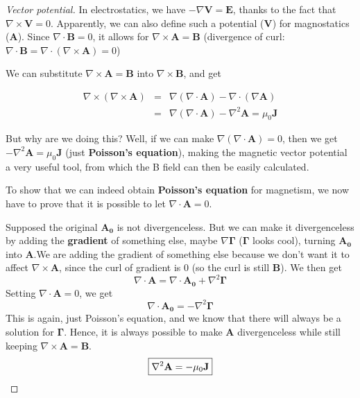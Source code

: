 \begin{proof}[Vector potential]
    In electrostatics, we have $-\nabla \mathbf{V}=\mathbf{E}$, thanks to the fact that $\nabla \times \mathbf{V}=0$.
    Apparently, we can also define such a potential ($\mathbf{V}$) for magnostatics ($\mathbf{A}$).
    Since $\nabla \cdot \mathbf{B}=0$, it allows for $\nabla \times \mathbf{A}=\mathbf{B}$ (divergence of curl: $\nabla \cdot \mathbf{B}=\nabla \cdot (\nabla \times \mathbf{A})=0$)

    We can substitute $\nabla \times \mathbf{A}=\mathbf{B}$ into $\nabla \times \mathbf{B}$, and get

    \begin{eqnarray}
        \nabla \times (\nabla \times \mathbf{A})&=&\nabla(\nabla \cdot \mathbf{A})-\nabla \cdot (\nabla \mathbf{A})\\
        &=&\nabla(\nabla \cdot \mathbf{A})-\nabla^2 \mathbf{A}=\mu_0 \mathbf{J}
    \end{eqnarray}

    But why are we doing this? Well, if we can make $\nabla(\nabla \cdot \mathbf{A})=0$, then we get $-\nabla^2 \mathbf{A}=\mu_0 \mathbf{J}$ (just \textbf{Poisson's equation}), making the magnetic vector potential a very useful tool, from which the B field can then be easily calculated.

    To show that we can indeed obtain \textbf{Poisson's equation} for magnetism, we now have to prove that it is possible to let $\nabla \cdot \mathbf{A}=0$.

    Supposed the original $\mathbf{A_0}$ is not divergenceless. But we can make it divergenceless by adding the \textbf{gradient} of something else, maybe $\nabla \mathbf{\Gamma}$ ($\mathbf{\Gamma}$ looks cool), turning $\mathbf{A_0}$ into $\mathbf{A}$.We are adding the gradient of something else because we don't want it to affect $\nabla \times \mathbf{A}$, since the curl of gradient is 0 (so the curl is still $\mathbf{B}$). We then get
    \begin{equation}
        \nabla \cdot \mathbf{A}=\nabla \cdot \mathbf{A_0}+\nabla ^2 \mathbf{\Gamma}
    \end{equation}
    Setting $\nabla \cdot \mathbf{A}=0$, we get
    \begin{equation}
        \nabla \cdot \mathbf{A_0}=-\nabla ^2 \mathbf{\Gamma}
    \end{equation}
    This is again, just Poisson's equation, and we know that there will always be a solution for $\mathbf{\Gamma}$. Hence, it is always possible to make $\mathbf{A}$ divergenceless while still keeping $\nabla \times \mathbf{A}=\mathbf{B}$.
    \begin{equation}
        \boxed{\nabla^2 \mathbf{A}=-\mu_0 \mathbf{J}}\qedhere
    \end{equation}
\end{proof}

